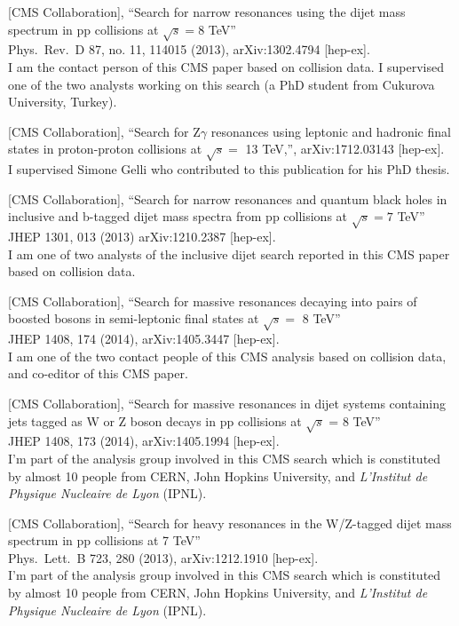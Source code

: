\documentclass[10pt, a4paper]{article}
\begin{document}
\begin{thebibliography}{599}
[CMS Collaboration],
 ``Search for narrow resonances using the dijet mass spectrum in pp collisions at $\sqrt{s}=8$ TeV''\\
Phys.\ Rev.\ D 87, no. 11, 114015 (2013), arXiv:1302.4794 [hep-ex].
 \\ I am the contact person of this CMS paper based on collision data. I supervised one of the two analysts working on this search (a PhD student from Cukurova University, Turkey).  

[CMS Collaboration],
 ``Search for Z$\gamma$ resonances using leptonic and hadronic final
 states in proton-proton collisions at $\sqrt{s}=$ 13 TeV,'',
 arXiv:1712.03143 [hep-ex].
 \\ I supervised Simone Gelli who contributed to this publication for his PhD thesis.  

[CMS Collaboration],
 ``Search for narrow resonances and quantum black holes in inclusive and b-tagged dijet mass spectra from pp collisions at $\sqrt{s}=7$ TeV''\\
 JHEP 1301, 013 (2013) arXiv:1210.2387 [hep-ex].
 \\ I am one of two analysts of the inclusive dijet search reported in this CMS paper based on collision data.

[CMS Collaboration],
 ``Search for massive resonances decaying into pairs of boosted bosons in semi-leptonic final states at $\sqrt{s} =$ 8 TeV''\\
  JHEP 1408, 174 (2014), arXiv:1405.3447 [hep-ex].
  \\I am one of the two contact people of this CMS analysis based on collision data, and co-editor of this CMS paper.

[CMS Collaboration],
``Search for massive resonances in dijet systems containing jets
   tagged as W or Z boson decays in pp collisions at $ \sqrt{s} $ = 8 TeV''\\ 
JHEP 1408, 173 (2014), arXiv:1405.1994 [hep-ex].
 \\ I'm part of the analysis group involved in this CMS search which is constituted by almost 10 people from CERN, John Hopkins University, and \textit{L'Institut de Physique Nucleaire de Lyon} (IPNL).

[CMS Collaboration],
 ``Search for heavy resonances in the W/Z-tagged dijet mass spectrum in pp collisions at 7 TeV''\\
Phys.\ Lett.\ B 723, 280 (2013), arXiv:1212.1910 [hep-ex].
 \\ I'm part of the analysis group involved in this CMS search which
 is constituted by almost 10 people from CERN, John Hopkins
 University, and \textit{L'Institut de Physique Nucleaire de Lyon}
 (IPNL).


\end{thebibliography}
\end{document}
